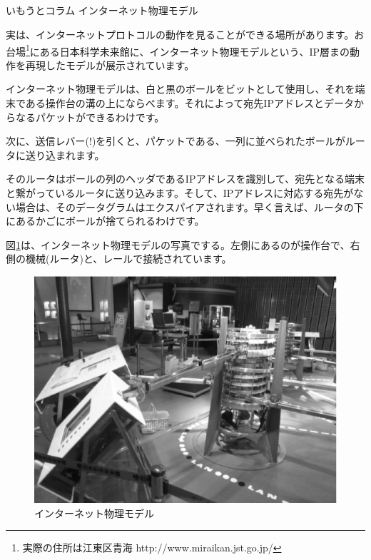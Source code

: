 \subsection*{}
\begin{itembox}[l]{いもうとコラム インターネット物理モデル}


実は、インターネットプロトコルの動作を見ることができる場所があります。お台場\footnote{実際の住所は江東区青海 http://www.miraikan.jst.go.jp/}にある日本科学未来館に、インターネット物理モデルという、IP層まの動作を再現したモデルが展示されています。

インターネット物理モデルは、白と黒のボールをビットとして使用し、それを端末である操作台の溝の上にならべます。それによって宛先IPアドレスとデータからなるパケットができるわけです。

次に、送信レバー(!)を引くと、パケットである、一列に並べられたボールがルータに送り込まれます。

そのルータはボールの列のヘッダであるIPアドレスを識別して、宛先となる端末と繋がっているルータに送り込みます。そして、IPアドレスに対応する宛先がない場合は、そのデータグラムはエクスパイアされます。早く言えば、ルータの下にあるかごにボールが捨てられるわけです。

図\ref{fig:miraikan}は、インターネット物理モデルの写真でする。左側にあるのが操作台で、右側の機械(ルータ)と、レールで接続されています。
\end{itembox}


\begin{figure}[htbp]
	\includegraphics[width=12cm,clip]{draw/miraikan.eps}
	\caption{インターネット物理モデル}
	\label{fig:miraikan}
\end{figure}

